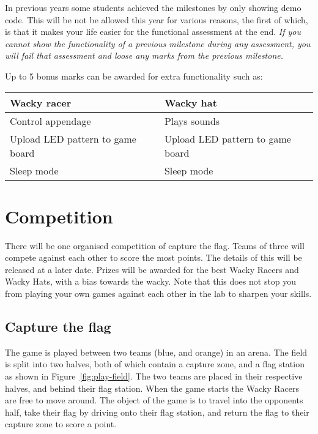 \documentclass[11pt, a4paper]{article}
\begin{document}
%
In previous years some students achieved the milestones by only showing demo code.
This will be not be allowed this year for various reasons, the first of which, is that
it makes your life easier for the functional assessment at the end. \emph{If you cannot
show the functionality of a previous milestone during any assessment, you will fail that
assessment and loose any marks from the previous milestone.}


Up to 5 bonus marks can be awarded for extra functionality such as:
%
\begin{flushleft}
  \begin{tabular}{l|l}
    Wacky racer & Wacky hat \\ \hline \hline
    Control appendage              & Plays sounds \\
    Upload LED pattern to game board & Upload LED pattern to game board \\
    Sleep mode                 & Sleep mode \\
  \end{tabular}
\end{flushleft}




\section{Competition}

There will be one organised competition of capture the flag. Teams of three will
compete against each other to score the most points. The details of this will be
released at a later date. Prizes will be awarded for the best Wacky Racers and
Wacky Hats, with a bias towards the wacky. Note that this does not stop you from
playing your own games against each other in the lab to sharpen your skills.


\subsection{Capture the flag}

The game is played between two teams (blue, and orange) in an arena. The field
is split into two halves, both of which contain a capture zone, and a flag
station as shown in Figure~\ref{fig:play-field}. The two teams are placed in
their respective halves, and behind their flag station. When the game starts the
Wacky Racers are free to move around. The object of the game is to travel into
the opponents half, take their flag by driving onto their flag station, and
return the flag to their capture zone to score a point.
\end{document}
